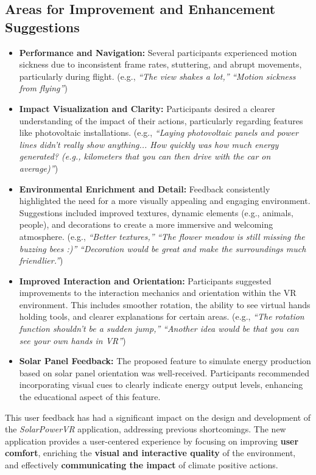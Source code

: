 \documentclass[draft, final]{vutinfth} %
\begin{document}
\subsection{Areas for Improvement and Enhancement Suggestions}

\begin{itemize}
    \item \textbf{Performance and Navigation:} Several participants experienced motion sickness due to inconsistent frame rates, stuttering, and abrupt movements, particularly during flight. (e.g., \textit{``The view shakes a lot,''} \textit{``Motion sickness from flying''})
    \item \textbf{Impact Visualization and Clarity:} Participants desired a clearer understanding of the impact of their actions, particularly regarding features like photovoltaic installations. (e.g., \textit{``Laying photovoltaic panels and power lines didn't really show anything... How quickly was how much energy generated? (e.g., kilometers that you can then drive with the car on average)''})
    \item \textbf{Environmental Enrichment and Detail:} Feedback consistently highlighted the need for a more visually appealing and engaging environment. Suggestions included improved textures, dynamic elements (e.g., animals, people), and decorations to create a more immersive and welcoming atmosphere. (e.g., \textit{``Better textures,''} \textit{``The flower meadow is still missing the buzzing bees :)''} \textit{``Decoration would be great and make the surroundings much friendlier.''})
    \item \textbf{Improved Interaction and Orientation:}  Participants suggested improvements to the interaction mechanics and orientation within the VR environment. This includes smoother rotation, the ability to see virtual hands holding tools, and clearer explanations for certain areas. (e.g., \textit{``The rotation function shouldn't be a sudden jump,''} \textit{``Another idea would be that you can see your own hands in VR''})
    \item \textbf{Solar Panel Feedback:} The proposed feature to simulate energy production based on solar panel orientation was well-received. Participants recommended incorporating visual cues to clearly indicate energy output levels, enhancing the educational aspect of this feature.
\end{itemize}

This user feedback has had a significant impact on the design and development of the \textit{SolarPowerVR} application, addressing previous shortcomings. The new application provides a user-centered experience by focusing on improving \textbf{user comfort}, enriching the \textbf{visual and interactive quality} of the environment, and effectively \textbf{communicating the impact} of climate positive actions.
\end{document}
